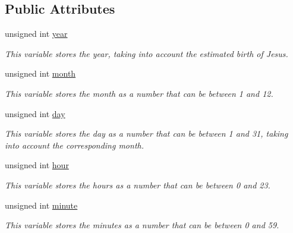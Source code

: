 \subsection*{Public Attributes}
\begin{DoxyCompactItemize}
\item 
\mbox{\label{structTimeData_a457ba435747cdc51aa3c9213dc75e916}} 
unsigned int \hyperlink{structTimeData_a457ba435747cdc51aa3c9213dc75e916}{year}
\begin{DoxyCompactList}\small\item\em This variable stores the year, taking into account the estimated birth of Jesus. \end{DoxyCompactList}\item 
\mbox{\label{structTimeData_a54ec81ff233394814cb837c41cd3ea0b}} 
unsigned int \hyperlink{structTimeData_a54ec81ff233394814cb837c41cd3ea0b}{month}
\begin{DoxyCompactList}\small\item\em This variable stores the month as a number that can be between 1 and 12. \end{DoxyCompactList}\item 
\mbox{\label{structTimeData_aee725dc9551cd482534c155a168b3d60}} 
unsigned int \hyperlink{structTimeData_aee725dc9551cd482534c155a168b3d60}{day}
\begin{DoxyCompactList}\small\item\em This variable stores the day as a number that can be between 1 and 31, taking into account the corresponding month. \end{DoxyCompactList}\item 
\mbox{\label{structTimeData_a989207381ecc5a4c744bd06bf1091c63}} 
unsigned int \hyperlink{structTimeData_a989207381ecc5a4c744bd06bf1091c63}{hour}
\begin{DoxyCompactList}\small\item\em This variable stores the hours as a number that can be between 0 and 23. \end{DoxyCompactList}\item 
\mbox{\label{structTimeData_ac22938d020a988bebae2493b118b9df2}} 
unsigned int \hyperlink{structTimeData_ac22938d020a988bebae2493b118b9df2}{minute}
\begin{DoxyCompactList}\small\item\em This variable stores the minutes as a number that can be between 0 and 59. \end{DoxyCompactList}\item 

\end{DoxyCompactItemize}

